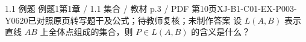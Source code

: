 \par\noindent\begin{minipage}{\linewidth}
\begin{bankitem}{1.1 例题 例题1}{第1章 / 1.1 集合 / 教材 p.3 / PDF 第10页}{XJ-B1-C01-EX-P003-Y0620}{已对照原页转写题干及公式；待教师复核；未制作答案}
设 $L(A,B)$ 表示直线 $AB$ 上全体点组成的集合，则 $P\in L(A,B)$ 的含义是什么？
\end{bankitem}
\end{minipage}\par\medskip
